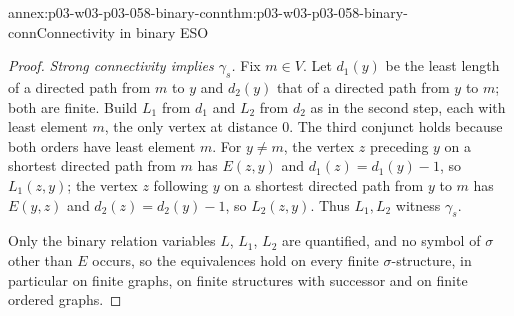 \begin{annexitem}{annex:p03-w03-p03-058-binary-conn}{thm:p03-w03-p03-058-binary-conn}{Connectivity in binary ESO}
\begin{proof}
\emph{Strong connectivity implies \(\gamma_s\).} Fix \(m\in V\). Let
\(d_1(y)\) be the least length of a directed path from \(m\) to \(y\) and
\(d_2(y)\) that of a directed path from \(y\) to \(m\); both are finite.
Build \(L_1\) from \(d_1\) and \(L_2\) from \(d_2\) as in the second step,
each with least element \(m\), the only vertex at distance \(0\). The third
conjunct holds because both orders have least element \(m\). For
\(y\ne m\), the vertex \(z\) preceding \(y\) on a shortest directed path
from \(m\) has \(E(z,y)\) and \(d_1(z)=d_1(y)-1\), so \(L_1(z,y)\); the
vertex \(z\) following \(y\) on a shortest directed path from \(y\) to
\(m\) has \(E(y,z)\) and \(d_2(z)=d_2(y)-1\), so \(L_2(z,y)\). Thus
\(L_1,L_2\) witness \(\gamma_s\).

Only the binary relation variables \(L\), \(L_1\), \(L_2\) are quantified,
and no symbol of \(\sigma\) other than \(E\) occurs, so the equivalences
hold on every finite \(\sigma\)-structure, in particular on finite graphs,
on finite structures with successor and on finite ordered graphs.
\end{proof}
\end{annexitem}

